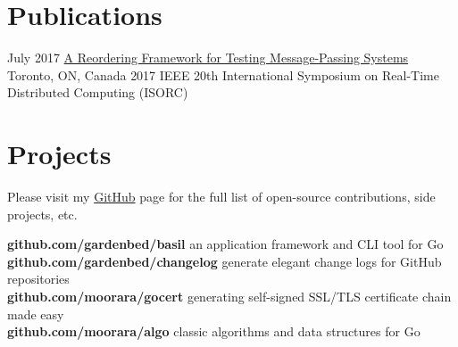 \documentclass[]{cv-style}                     %
\begin{document}
\section{Publications}

\begin{entrylist}

  \entry
  {\small July 2017}
  {\href{http://ieeexplore.ieee.org/abstract/document/7964877}{A Reordering Framework for Testing Message-Passing Systems}}
  {Toronto, ON, Canada}
  {\small{2017 IEEE 20th International Symposium on Real-Time Distributed Computing (ISORC)}}

\end{entrylist}



\section{Projects}

Please visit my \href{http://github.com/moorara}{GitHub} page for the full list of open-source contributions, side projects, etc.

\textbf{github.com/gardenbed/basil} an application framework and CLI tool for Go  \\
\textbf{github.com/gardenbed/changelog} generate elegant change logs for GitHub repositories  \\
\textbf{github.com/moorara/gocert} generating self-signed SSL/TLS certificate chain made easy \\
\textbf{github.com/moorara/algo} classic algorithms and data structures for Go \\

\begin{entrylist}



\end{entrylist}
\end{document}
